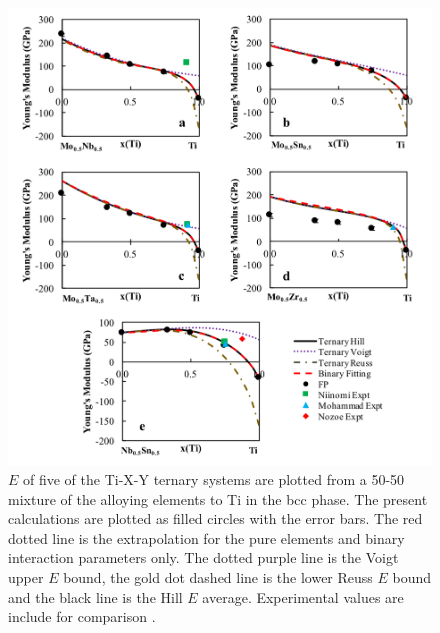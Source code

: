 \pagebreak
\begin{figure}[H]
	\centering
	\includegraphics[width=\textwidth]{Chapter-6/Figures/tixyyoungs1.png}
	\caption{$E$ of five of the Ti-X-Y ternary systems are plotted from a 50-50 mixture of the alloying elements to Ti in the bcc phase. The present calculations are plotted as filled circles with the error bars. The red dotted line is the extrapolation for the pure elements and binary interaction parameters only. The dotted purple line is the Voigt upper $E$ bound, the gold dot dashed line is the lower Reuss $E$ bound and the black line is the Hill $E$ average. Experimental values are include for comparison \cite{Niinomi2012,Mohammed2014,Nozoe2007,Geetha2009}.}
	\label{Ch6-figure:tixyyoungs1}
\end{figure}

